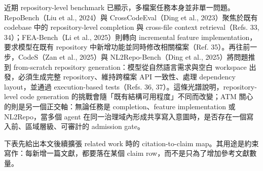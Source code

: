 \documentclass[a4paper,fontset=none]{ctexart}
\begin{document}
近期 repository-level benchmark 已顯示，多檔案任務本身並非單一問題。RepoBench（Liu et al., 2024）與 CrossCodeEval（Ding et al., 2023）聚焦於既有 codebase 中的 repository-level completion 與 cross-file context retrieval（Refs. 33, 34）；FEA-Bench（Li et al., 2025）則轉向 incremental feature implementation，要求模型在既有 repository 中新增功能並同時修改相關檔案（Ref. 35）。再往前一步，CodeS（Zan et al., 2025）與 NL2Repo-Bench（Ding et al., 2025）將問題推到 from-scratch repository generation：模型從自然語言需求與空白 workspace 出發，必須生成完整 repository、維持跨檔案 API 一致性、處理 dependency layout，並通過 execution-based tests（Refs. 36, 37）。這條光譜說明，repository-level code generation 的挑戰會隨「既有結構可用程度」不同而改變；ATM 關心的則是另一個正交軸：無論任務是 completion、feature implementation 或 NL2Repo，當多個 agent 在同一治理域內形成共享寫入意圖時，是否存在一個寫入前、區域層級、可審計的 admission gate。

下表先給出本文後續擴張 related work 時的 citation-to-claim map。其用途是約束寫作：每新增一篇文獻，都要落在某個 claim row，而不是只為了增加參考文獻數量。

\smallskip{}\par\smallskip
\end{document}
